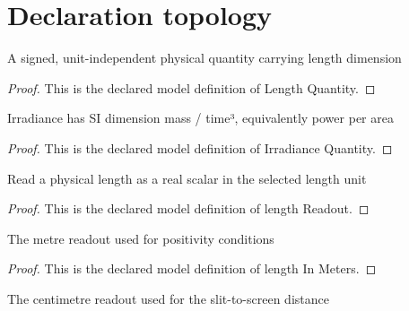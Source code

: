 \section{Declaration topology}
\begin{definition}
  \label{def:physics:phyx-mini-0126:phyxminiproblems-problemphyxmini0126-lengthquantity}
  A signed, unit-independent physical quantity carrying length dimension
\end{definition}
\begin{proof}
  This is the declared model definition of Length Quantity.
\end{proof}
\begin{definition}
  \label{def:physics:phyx-mini-0126:phyxminiproblems-problemphyxmini0126-irradiancequantity}
  Irradiance has SI dimension mass / time³, equivalently power per area
\end{definition}
\begin{proof}
  This is the declared model definition of Irradiance Quantity.
\end{proof}
\begin{definition}
  \label{def:physics:phyx-mini-0126:phyxminiproblems-problemphyxmini0126-lengthreadout}
  Read a physical length as a real scalar in the selected length unit
\end{definition}
\begin{proof}
  This is the declared model definition of length Readout.
\end{proof}
\begin{definition}
  \label{def:physics:phyx-mini-0126:phyxminiproblems-problemphyxmini0126-lengthinmeters}
  The metre readout used for positivity conditions
\end{definition}
\begin{proof}
  This is the declared model definition of length In Meters.
\end{proof}
\begin{definition}
  \label{def:physics:phyx-mini-0126:phyxminiproblems-problemphyxmini0126-lengthincentimeters}
  The centimetre readout used for the slit-to-screen distance
\end{definition}
